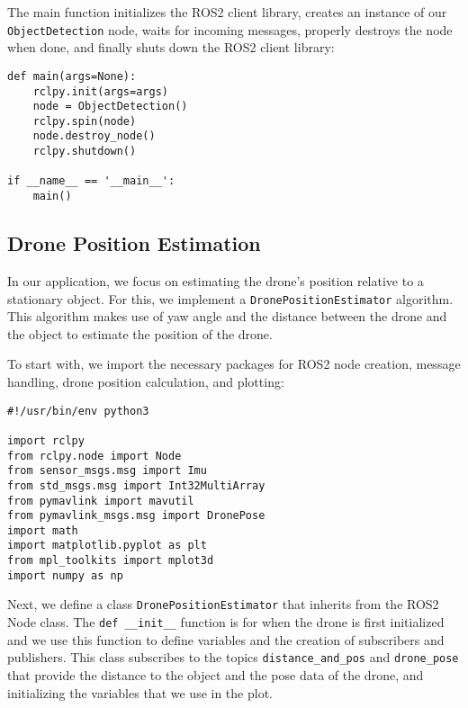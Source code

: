 The main function initializes the ROS2 client library, creates an instance of our \verb|ObjectDetection| node, waits for incoming messages, properly destroys the node when done, and finally shuts down the ROS2 client library:

\begin{lstlisting}[language=PythonPlus]
def main(args=None):
    rclpy.init(args=args)
    node = ObjectDetection()
    rclpy.spin(node)
    node.destroy_node()
    rclpy.shutdown()

if __name__ == '__main__':
    main()
\end{lstlisting}


\subsection{Drone Position Estimation}

In our application, we focus on estimating the drone's position relative to a stationary object. For this, we implement a \verb|DronePositionEstimator| algorithm. This algorithm makes use of yaw angle and the distance between the drone and the object to estimate the position of the drone.

To start with, we import the necessary packages for ROS2 node creation, message handling, drone position calculation, and plotting:

\begin{lstlisting}[language=PythonPlus]
#!/usr/bin/env python3

import rclpy
from rclpy.node import Node
from sensor_msgs.msg import Imu
from std_msgs.msg import Int32MultiArray
from pymavlink import mavutil
from pymavlink_msgs.msg import DronePose
import math
import matplotlib.pyplot as plt
from mpl_toolkits import mplot3d
import numpy as np

\end{lstlisting}

Next, we define a class \verb|DronePositionEstimator| that inherits from the ROS2 Node class. The \verb|def __init__| function is for when the drone is first initialized and we use this function to define variables and the creation of subscribers and publishers. This class subscribes to the topics \verb|distance_and_pos| and \verb|drone_pose| that provide the distance to the object and the pose data of the drone, and initializing the variables that we use in the plot.

